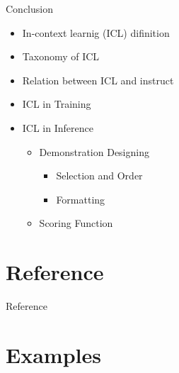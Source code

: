 \documentclass[aspectratio=1610,xcolor={dvipsnames},hyperref={colorlinks,unicode,linkcolor=violet,anchorcolor=BlueViolet,citecolor=YellowOrange,filecolor=black,urlcolor=Aquamarine}]{beamer}
\begin{document}
\begin{frame}[label={sec:org66ba318}]{Conclusion}
\begin{itemize}
\item In-context learnig (ICL) difinition
\item Taxonomy of ICL
\item Relation between ICL and instruct
\item ICL in Training
\item ICL in Inference
\begin{itemize}
\item Demonstration Designing
\begin{itemize}
\item Selection and Order
\item Formatting
\end{itemize}
\item Scoring Function
\end{itemize}
\end{itemize}
\end{frame}

\section{Reference}
\label{sec:orgeb5d522}

\begin{frame}[allowframebreaks]{Reference}
\printbibliography
\end{frame}

\section{Examples}
\label{sec:org1525a82}
\end{document}
